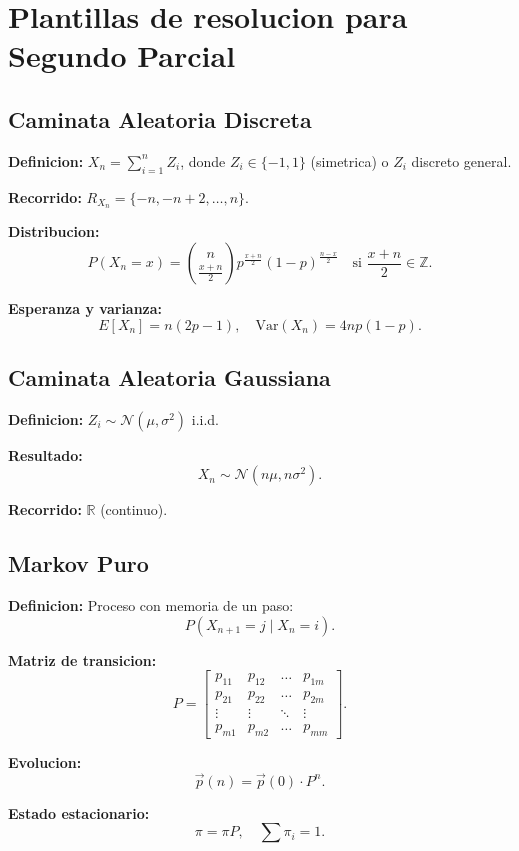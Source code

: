 \documentclass{article}
\begin{document}
\section{Plantillas de resolucion para Segundo Parcial}

\subsection{Caminata Aleatoria Discreta}

\textbf{Definicion:} $X_n = \sum_{i=1}^n Z_i$, donde $Z_i \in \{-1, 1\}$ (simetrica) o $Z_i$ discreto general.

\textbf{Recorrido:} $R_{X_n} = \{-n, -n+2, \dots, n\}$.

\textbf{Distribucion:}
\[
  P(X_n = x) = \binom{n}{\frac{x+n}{2}} p^{\frac{x+n}{2}} (1-p)^{\frac{n-x}{2}} \quad \text{si } \frac{x+n}{2} \in \mathbb{Z}.
\]

\textbf{Esperanza y varianza:}
\[
  E[X_n] = n (2p - 1), \quad \text{Var}(X_n) = 4n p(1-p).
\]

\subsection{Caminata Aleatoria Gaussiana}

\textbf{Definicion:} $Z_i \sim \mathcal{N}(\mu, \sigma^2)$ i.i.d.

\textbf{Resultado:}
\[
  X_n \sim \mathcal{N}(n\mu, n\sigma^2).
\]

\textbf{Recorrido:} $\mathbb{R}$ (continuo).

\subsection{Markov Puro}

\textbf{Definicion:} Proceso con memoria de un paso:
\[
  P(X_{n+1} = j \mid X_n = i).
\]

\textbf{Matriz de transicion:}
\[
  P = \begin{bmatrix}
    p_{11} & p_{12} & \dots & p_{1m} \\
    p_{21} & p_{22} & \dots & p_{2m} \\
    \vdots & \vdots & \ddots & \vdots \\
    p_{m1} & p_{m2} & \dots & p_{mm}
  \end{bmatrix}.
\]

\textbf{Evolucion:}
\[
  \vec{p}(n) = \vec{p}(0) \cdot P^n.
\]

\textbf{Estado estacionario:}
\[
  \pi = \pi P, \quad \sum \pi_i = 1.
\]
\end{document}
